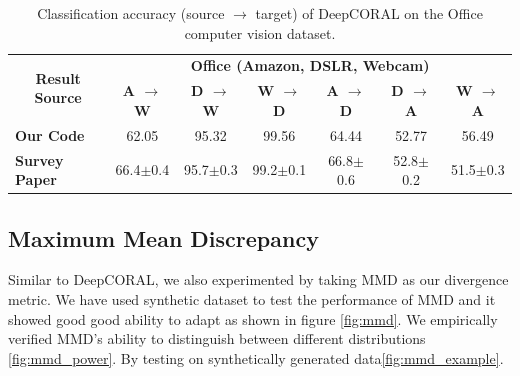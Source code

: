 \documentclass{article}
\begin{document}
\begin{table}
  \caption{Classification accuracy (source $\rightarrow$ target) of DeepCORAL on the Office computer vision dataset.}
  \label{comparePerformance2}
  \begin{scriptsize}
  \begin{center}
  {\renewcommand{\arraystretch}{1.4}
  \begin{tabular}{@{}l cccccc@{}}
  \toprule
  \multicolumn{1}{c}{\multirow{2}{*}{\textbf{Result Source}}} & \multicolumn{6}{c}{\textbf{Office (Amazon, DSLR, Webcam)}} \\
  \cmidrule{2-7}
   & \textbf{A $\rightarrow$ W} & \textbf{D $\rightarrow$ W} & \textbf{W $\rightarrow$ D} & \textbf{A $\rightarrow$ D} & \textbf{D $\rightarrow$ A} & \textbf{W $\rightarrow$ A} \\
  \midrule
  \textbf{Our Code} & 62.05 & 95.32 & 99.56 & 64.44 & 52.77 & 56.49\\
  \hline
  \textbf{Survey Paper} & 66.4$\pm$0.4 & 95.7$\pm$0.3 & 99.2$\pm$0.1 & 66.8$\pm$0.6 & 52.8$\pm$0.2 & 51.5$\pm$0.3\\
  \bottomrule
  \end{tabular}
  }
  \end{center}
  \end{scriptsize}
  \label{tab:deepcoral}
\end{table}

\subsection{Maximum Mean Discrepancy}
Similar to DeepCORAL, we also experimented by taking MMD as our divergence metric. We have used synthetic dataset to test the performance of MMD and it showed good good ability to adapt as shown in figure \ref{fig:mmd}. We empirically verified MMD's ability to distinguish between different distributions \ref{fig:mmd_power}. By testing on synthetically generated data\ref{fig:mmd_example}. 
\end{document}
